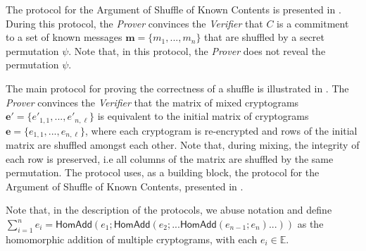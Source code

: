 The protocol for the Argument of Shuffle of Known Contents is presented in . During this protocol, the \textit{Prover} convinces the \textit{Verifier} that $C$ is a commitment to a set of known messages $\boldsymbol{m} = \{m_1, ..., m_n\}$ that are shuffled by a secret permutation $\psi$. Note that, in this protocol, the \textit{Prover} does not reveal the permutation $\psi$.

The main protocol for proving the correctness of a shuffle is illustrated in . The \textit{Prover} convinces the \textit{Verifier} that the matrix of mixed cryptograms $\boldsymbol{e'} = \{e'_{1,1}, ..., e'_{n,\ell}\}$ is equivalent to the initial matrix of cryptograms $\boldsymbol{e} = \{e_{1,1}, ..., e_{n,\ell}\}$, where each cryptogram is re-encrypted and rows of the initial matrix are shuffled amongst each other. Note that, during mixing, the integrity of each row is preserved, i.e all columns of the matrix are shuffled by the same permutation. The protocol uses, as a building block, the protocol for the Argument of Shuffle of Known Contents, presented in .

Note that, in the description of the protocols, we abuse notation and define $\sum_{i=1}^n e_i = \mathsf{HomAdd}(e_1; \mathsf{HomAdd}(e_2; ... \mathsf{HomAdd}(e_{n-1}; e_n) ... ))$ as the homomorphic addition of multiple cryptograms, with each $e_i \in \mathbb{E}$.

